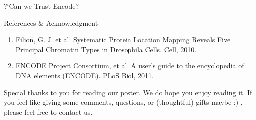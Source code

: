 \documentclass[serif,mathserif,final]{beamer}
\begin{document}
\begin{frame}{}
\begin{columns}[t]
\begin{column}{0.32\linewidth}
\begin{block}{?`Can we Trust Encode?}
      \end{block}

      \begin{block}{References \& Acknowledgment}
      	\begin{enumerate}
      		\item Filion, G. J. et al. Systematic Protein Location Mapping Reveals Five Principal Chromatin Types in Drosophila Cells. Cell, 2010.
      		\item ENCODE Project Consortium, et al. A user's guide to the encyclopedia of DNA elements (ENCODE). PLoS Biol, 2011.\\[45pt]
		\end{enumerate}
		

	   \begin{shadequote}
      	Special thanks to you for reading our poster. We do hope you enjoy reading it. If you feel like giving some comments, questions, or (thoughtful) gifts maybe :) , please feel free to contact us.	
      \end{shadequote}
		
      \end{block}

    \end{column}%

  \end{columns}
\end{frame}
\end{document}
